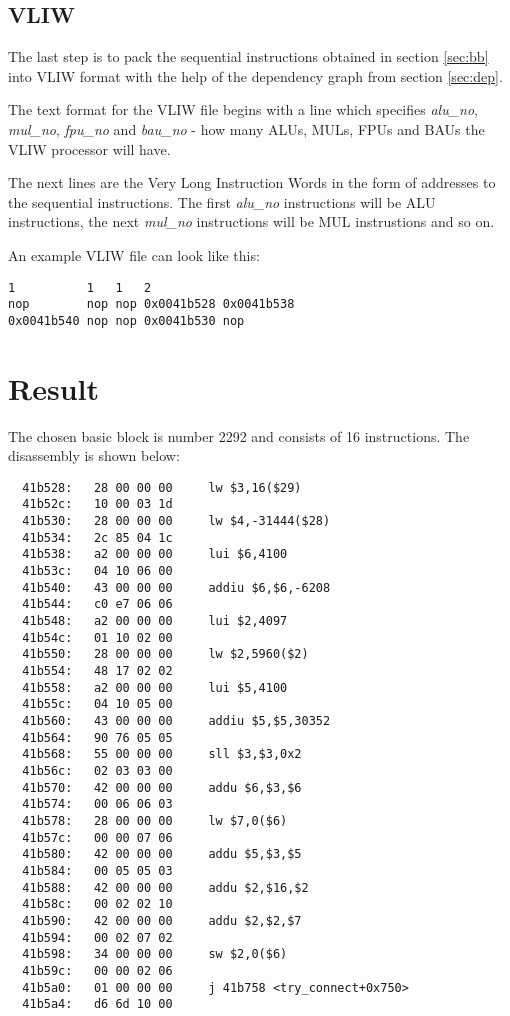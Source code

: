 \documentclass[titlepage, a4paper]{article}
\begin{document}
\subsection{VLIW}
The last step is to pack the sequential instructions obtained in section \ref{sec:bb} into VLIW format with the help of the dependency graph from section \ref{sec:dep}.

The text format for the VLIW file begins with a line which specifies \textit{alu\_no}, \textit{mul\_no}, \textit{fpu\_no} and \textit{bau\_no} - how many ALUs, MULs, FPUs and BAUs the VLIW processor will have.

The next lines are the Very Long Instruction Words in the form of addresses to the sequential instructions. The first \textit{alu\_no} instructions will be ALU instructions, the next \textit{mul\_no} instructions will be MUL instrustions and so on.

An example VLIW file can look like this:

\begin{lstlisting}
1          1   1   2
nop        nop nop 0x0041b528 0x0041b538
0x0041b540 nop nop 0x0041b530 nop
\end{lstlisting}

\section{Result}
The chosen basic block is number 2292 and consists of 16 instructions. The disassembly is shown below:

\begin{lstlisting}
  41b528:	28 00 00 00 	lw $3,16($29)
  41b52c:	10 00 03 1d 
  41b530:	28 00 00 00 	lw $4,-31444($28)
  41b534:	2c 85 04 1c 
  41b538:	a2 00 00 00 	lui $6,4100
  41b53c:	04 10 06 00 
  41b540:	43 00 00 00 	addiu $6,$6,-6208
  41b544:	c0 e7 06 06 
  41b548:	a2 00 00 00 	lui $2,4097
  41b54c:	01 10 02 00 
  41b550:	28 00 00 00 	lw $2,5960($2)
  41b554:	48 17 02 02 
  41b558:	a2 00 00 00 	lui $5,4100
  41b55c:	04 10 05 00 
  41b560:	43 00 00 00 	addiu $5,$5,30352
  41b564:	90 76 05 05 
  41b568:	55 00 00 00 	sll $3,$3,0x2
  41b56c:	02 03 03 00 
  41b570:	42 00 00 00 	addu $6,$3,$6
  41b574:	00 06 06 03 
  41b578:	28 00 00 00 	lw $7,0($6)
  41b57c:	00 00 07 06 
  41b580:	42 00 00 00 	addu $5,$3,$5
  41b584:	00 05 05 03 
  41b588:	42 00 00 00 	addu $2,$16,$2
  41b58c:	00 02 02 10 
  41b590:	42 00 00 00 	addu $2,$2,$7
  41b594:	00 02 07 02 
  41b598:	34 00 00 00 	sw $2,0($6)
  41b59c:	00 00 02 06 
  41b5a0:	01 00 00 00 	j 41b758 <try_connect+0x750>
  41b5a4:	d6 6d 10 00 
\end{lstlisting}
\end{document}
